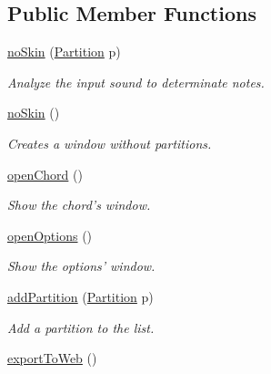 \subsection*{Public Member Functions}
\begin{DoxyCompactItemize}
\item 
\hyperlink{classno_skin_a78818e18958c67f5881225baddd61808}{no\-Skin} (\hyperlink{class_partition}{Partition} p)
\begin{DoxyCompactList}\small\item\em Analyze the input sound to determinate notes. \end{DoxyCompactList}\item 
\hypertarget{classno_skin_a3ce5b0b7f87254677d89e60f2a532587}{\hyperlink{classno_skin_a3ce5b0b7f87254677d89e60f2a532587}{no\-Skin} ()}\label{classno_skin_a3ce5b0b7f87254677d89e60f2a532587}

\begin{DoxyCompactList}\small\item\em Creates a window without partitions. \end{DoxyCompactList}\item 
\hypertarget{classno_skin_a057091ce99910df1c79d6cd324d103c4}{\hyperlink{classno_skin_a057091ce99910df1c79d6cd324d103c4}{open\-Chord} ()}\label{classno_skin_a057091ce99910df1c79d6cd324d103c4}

\begin{DoxyCompactList}\small\item\em Show the chord's window. \end{DoxyCompactList}\item 
\hypertarget{classno_skin_a99324c33fa5933ca59d356cd6dd0dd97}{\hyperlink{classno_skin_a99324c33fa5933ca59d356cd6dd0dd97}{open\-Options} ()}\label{classno_skin_a99324c33fa5933ca59d356cd6dd0dd97}

\begin{DoxyCompactList}\small\item\em Show the options' window. \end{DoxyCompactList}\item 
\hyperlink{classno_skin_a66cefcfae39d7c7d0797aa3b5b23b220}{add\-Partition} (\hyperlink{class_partition}{Partition} p)
\begin{DoxyCompactList}\small\item\em Add a partition to the list. \end{DoxyCompactList}\item 
\hypertarget{classno_skin_ac0123beb04a7531f4ece7084779d6295}{\hyperlink{classno_skin_ac0123beb04a7531f4ece7084779d6295}{export\-To\-Web} ()}\label{classno_skin_ac0123beb04a7531f4ece7084779d6295}


\end{DoxyCompactItemize}
